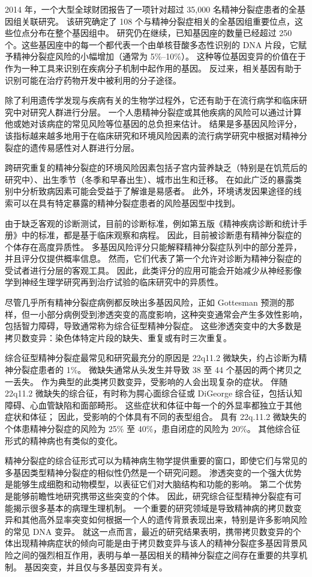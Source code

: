 2014 年，一个大型全球财团报告了一项针对超过 35,000 名精神分裂症患者的全基因组关联研究。 该研究确定了 108 个与精神分裂症相关的全基因组重要位点，这些位点分布在整个基因组中。 研究仍在继续，已知基因座的数量已经超过 250 个。这些基因座中的每一个都代表一个由单核苷酸多态性识别的 DNA 片段，它赋予精神分裂症风险的小幅增加（通常为 5\%–10\%）。 这种等位基因变异的价值在于作为一种工具来识别在疾病分子机制中起作用的基因。 反过来，相关基因有助于识别可能在治疗药物开发中被利用的分子途径。

除了利用遗传学发现与疾病有关的生物学过程外，它还有助于在流行病学和临床研究中对研究人群进行分层。 一个人患精神分裂症或其他疾病的风险可以通过计算他或她对该病症的常见风险等位基因的总负担来估计。 结果是多基因风险评分，该指标越来越多地用于在临床研究和环境风险因素的流行病学研究中根据对精神分裂症的遗传易感性对人群进行分层。

跨研究重复的精神分裂症的环境风险因素包括子宫内营养缺乏（特别是在饥荒后的研究中）、出生季节（冬季和早春出生）、城市出生和迁移。 在如此广泛的暴露类别中分析致病因素可能会受益于了解谁是易感者。 此外，环境诱发因果途径的线索可以在具有特定暴露的精神分裂症患者的风险基因型中找到。

由于缺乏客观的诊断测试，目前的诊断标准，例如第五版《精神疾病诊断和统计手册》中的标准，都是基于临床观察和病程。 因此，目前被诊断患有精神分裂症的个体存在高度异质性。 多基因风险评分只能解释精神分裂症队列中的部分差异，并且评分仅提供概率信息。 然而，它们代表了第一个允许对诊断为精神分裂症的受试者进行分层的客观工具。 因此，此类评分的应用可能会开始减少从神经影像学到神经生理学研究再到治疗试验的临床研究中的异质性。

尽管几乎所有精神分裂症病例都反映出多基因风险，正如 Gottesman 预测的那样，但一小部分病例受到渗透突变的高度影响，这种突变通常会产生多效性影响，包括智力障碍，导致通常称为综合征型精神分裂症。 这些渗透突变中的大多数是拷贝数变异：染色体特定片段的缺失、重复或有时三次重复。

综合征型精神分裂症最常见和研究最充分的原因是 22q11.2 微缺失，约占诊断为精神分裂症患者的 1\%。 微缺失通常从头发生并导致 38 至 44 个基因的两个拷贝之一丢失。 作为典型的此类拷贝数变异，受影响的人会出现复杂的症状。 伴随 22q11.2 微缺失的综合征，有时称为腭心面综合征或 DiGeorge 综合征，包括认知障碍、心血管缺陷和面部畸形。 这些症状和体征中每一个的外显率都独立于其他症状和体征； 因此，受影响的个体具有不同的表型组合。 具有 22q.11.2 微缺失的个体患精神分裂症的风险为 25\% 至 40\%，患自闭症的风险为 20\%。 其他综合征形式的精神病也有类似的变化。

精神分裂症的综合征形式可以为精神病生物学提供重要的窗口，即使它们与常见的多基因类型精神分裂症的相似性仍然是一个研究问题。 渗透突变的一个强大优势是能够生成细胞和动物模型，以表征它们对大脑结构和功能的影响。 第二个优势是能够前瞻性地研究携带这些突变的个体。 因此，研究综合征型精神分裂症有可能揭示很多基本的病理生理机制。 一个重要的研究领域是导致精神病的拷贝数变异和其他高外显率突变如何根据一个人的遗传背景表现出来，特别是许多影响风险的常见 DNA 变异。 就这一点而言，最近的研究结果表明，携带拷贝数变异的个体出现精神病症状的倾向可能是由于拷贝数变异与该人的精神分裂症多基因背景风险之间的强烈相互作用，表明与单一基因相关的精神分裂症之间存在重要的共享机制。 基因突变，并且仅与多基因变异有关。



